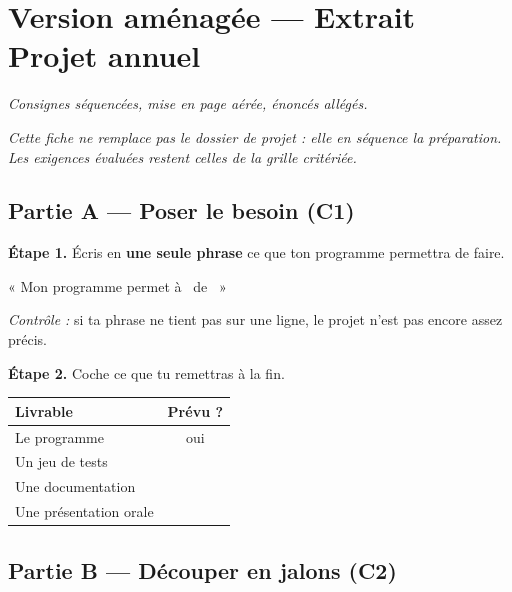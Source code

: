 \section*{Version aménagée --- Extrait Projet annuel}
\textit{Consignes séquencées, mise en page aérée, énoncés allégés.}

\medskip
\textit{Cette fiche ne remplace pas le dossier de projet : elle en séquence la
préparation. Les exigences évaluées restent celles de la grille critériée.}

\bigskip

\subsection*{Partie A --- Poser le besoin (C1)}

\textbf{Étape 1.} Écris en \textbf{une seule phrase} ce que ton programme permettra
de faire.

\medskip
« Mon programme permet à \dotfill\ de \dotfill\ »

\medskip
\textit{Contrôle :} si ta phrase ne tient pas sur une ligne, le projet n'est
pas encore assez précis.

\bigskip

\textbf{Étape 2.} Coche ce que tu remettras à la fin.

\bigskip

\begin{center}
\begin{tabular}{|l|c|}
\hline
\textbf{Livrable} & \textbf{Prévu ?} \\
\hline
Le programme & oui \\
\hline
Un jeu de tests & \dotfill \\
\hline
Une documentation & \dotfill \\
\hline
Une présentation orale & \dotfill \\
\hline
\end{tabular}
\end{center}

\bigskip
\bigskip

\subsection*{Partie B --- Découper en jalons (C2)}

